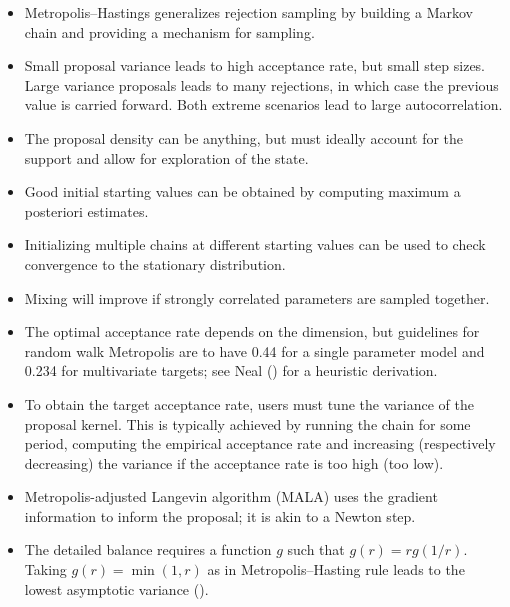 \documentclass[
  11pt,
  letterpaper,
]{scrbook}
\providecommand{\tightlist}{%
  \setlength{\itemsep}{0pt}\setlength{\parskip}{0pt}}
\theoremstyle{definition}
\theoremstyle{plain}
\theoremstyle{plain}
\theoremstyle{plain}
\theoremstyle{definition}
\theoremstyle{definition}
\theoremstyle{plain}
\theoremstyle{plain}
\theoremstyle{remark}
\begin{document}
\begin{tcolorbox}[enhanced jigsaw, arc=.35mm, bottomrule=.15mm, bottomtitle=1mm, breakable, colback=white, colbacktitle=quarto-callout-important-color!10!white, colframe=quarto-callout-important-color-frame, coltitle=black, left=2mm, leftrule=.75mm, opacityback=0, opacitybacktitle=0.6, rightrule=.15mm, title=\textcolor{quarto-callout-important-color}{\faExclamation}\hspace{0.5em}{\textbf{Summary}:}, titlerule=0mm, toprule=.15mm, toptitle=1mm]

\begin{itemize}
\tightlist
\item
  Metropolis--Hastings generalizes rejection sampling by building a
  Markov chain and providing a mechanism for sampling.
\item
  Small proposal variance leads to high acceptance rate, but small step
  sizes. Large variance proposals leads to many rejections, in which
  case the previous value is carried forward. Both extreme scenarios
  lead to large autocorrelation.
\item
  The proposal density can be anything, but must ideally account for the
  support and allow for exploration of the state.
\item
  Good initial starting values can be obtained by computing maximum a
  posteriori estimates.
\item
  Initializing multiple chains at different starting values can be used
  to check convergence to the stationary distribution.
\item
  Mixing will improve if strongly correlated parameters are sampled
  together.
\item
  The optimal acceptance rate depends on the dimension, but guidelines
  for random walk Metropolis are to have 0.44 for a single parameter
  model and 0.234 for multivariate targets; see Neal
  () for a heuristic derivation.
\item
  To obtain the target acceptance rate, users must tune the variance of
  the proposal kernel. This is typically achieved by running the chain
  for some period, computing the empirical acceptance rate and
  increasing (respectively decreasing) the variance if the acceptance
  rate is too high (too low).
\item
  Metropolis-adjusted Langevin algorithm (MALA) uses the gradient
  information to inform the proposal; it is akin to a Newton step.
\item
  The detailed balance requires a function \(g\) such that
  \(g(r) = rg(1/r).\) Taking \(g(r) = \min(1,r)\) as in
  Metropolis--Hasting rule leads to the lowest asymptotic variance
  ().
\end{itemize}

\end{tcolorbox}
\end{document}
